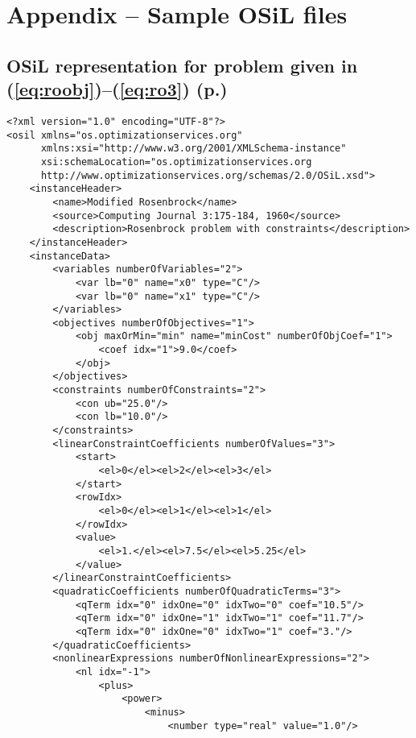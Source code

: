 
\section{Appendix -- Sample OSiL files}\label{section:appendix}

\subsection{OSiL representation for problem given in (\ref{eq:roobj})--(\ref{eq:ro3}) (p.\pageref{eq:roobj})}\label{section:rosenbrockXML}


{\normalsize \baselineskip 16pt \vspace{2pt}
\begin{verbatim}
<?xml version="1.0" encoding="UTF-8"?>
<osil xmlns="os.optimizationservices.org"
      xmlns:xsi="http://www.w3.org/2001/XMLSchema-instance"
      xsi:schemaLocation="os.optimizationservices.org
      http://www.optimizationservices.org/schemas/2.0/OSiL.xsd">
    <instanceHeader>
        <name>Modified Rosenbrock</name>
        <source>Computing Journal 3:175-184, 1960</source>
        <description>Rosenbrock problem with constraints</description>
    </instanceHeader>
    <instanceData>
        <variables numberOfVariables="2">
            <var lb="0" name="x0" type="C"/>
            <var lb="0" name="x1" type="C"/>
        </variables>
        <objectives numberOfObjectives="1">
            <obj maxOrMin="min" name="minCost" numberOfObjCoef="1">
                <coef idx="1">9.0</coef>
            </obj>
        </objectives>
        <constraints numberOfConstraints="2">
            <con ub="25.0"/>
            <con lb="10.0"/>
        </constraints>
        <linearConstraintCoefficients numberOfValues="3">
            <start>
                <el>0</el><el>2</el><el>3</el>
            </start>
            <rowIdx>
                <el>0</el><el>1</el><el>1</el>
            </rowIdx>
            <value>
                <el>1.</el><el>7.5</el><el>5.25</el>
            </value>
        </linearConstraintCoefficients>
        <quadraticCoefficients numberOfQuadraticTerms="3">
            <qTerm idx="0" idxOne="0" idxTwo="0" coef="10.5"/>
            <qTerm idx="0" idxOne="1" idxTwo="1" coef="11.7"/>
            <qTerm idx="0" idxOne="0" idxTwo="1" coef="3."/>
        </quadraticCoefficients>
        <nonlinearExpressions numberOfNonlinearExpressions="2">
            <nl idx="-1">
                <plus>
                    <power>
                        <minus>
                            <number type="real" value="1.0"/>

\end{verbatim}}
